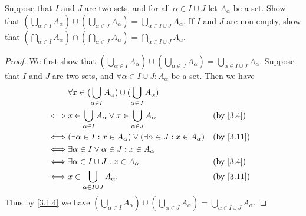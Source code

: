 \begin{ex}\label{ex:3.4.10}
	Suppose that \(I\) and \(J\) are two sets, and for all \(\alpha \in I \cup J\) let \(A_{\alpha}\) be a set.
	Show that \((\bigcup_{\alpha \in I} A_{\alpha}) \cup (\bigcup_{\alpha \in J} A_{\alpha}) = \bigcup_{\alpha \in I \cup J} A_{\alpha}\).
	If \(I\) and \(J\) are non-empty, show that \((\bigcap_{\alpha \in I} A_{\alpha}) \cap (\bigcap_{\alpha \in J} A_{\alpha}) = \bigcap_{\alpha \in I \cup J} A_{\alpha}\).
\end{ex}

\begin{proof}
	We first show that \((\bigcup_{\alpha \in I} A_{\alpha}) \cup (\bigcup_{\alpha \in J} A_{\alpha}) = \bigcup_{\alpha \in I \cup J} A_{\alpha}\).
	Suppose that \(I\) and \(J\) are two sets, and \(\forall \alpha \in I \cup J : A_{\alpha}\) be a set.
	Then we have
	\begin{align*}
		     & \forall x \in (\bigcup_{\alpha \in I} A_{\alpha}) \cup (\bigcup_{\alpha \in J} A_{\alpha})                \\
		\iff & x \in \bigcup_{\alpha \in I} A_{\alpha} \lor x \in \bigcup_{\alpha \in J} A_{\alpha}       &  & \by{3.4}  \\
		\iff & (\exists \alpha \in I : x \in A_{\alpha}) \lor (\exists \alpha \in J : x \in A_{\alpha})   &  & \by{3.11} \\
		\iff & \exists \alpha \in I \lor \alpha \in J : x \in A_{\alpha}                                                 \\
		\iff & \exists \alpha \in I \cup J : x \in A_{\alpha}                                             &  & \by{3.4}  \\
		\iff & x \in \bigcup_{\alpha \in I \cup J} A_{\alpha}.                                            &  & \by{3.11}
	\end{align*}
	Thus by \cref{3.1.4} we have \((\bigcup_{\alpha \in I} A_{\alpha}) \cup (\bigcup_{\alpha \in J} A_{\alpha}) = \bigcup_{\alpha \in I \cup J} A_{\alpha}\).


\end{proof}
